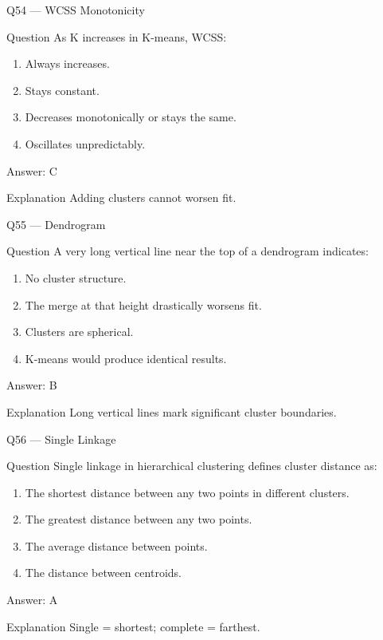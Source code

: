 \documentclass[aspectratio=169,8pt]{beamer}
\begin{document}
	\begin{frame}{Q54 --- WCSS Monotonicity}
		\begin{block}{Question}
			As K increases in K-means, WCSS:
		\end{block}
		\begin{enumerate}
			\item Always increases.
			\item Stays constant.
			\item Decreases monotonically or stays the same.
			\item Oscillates unpredictably.
		\end{enumerate}
		\begin{exampleblock}{Answer: C}\end{exampleblock}
		\begin{block}{Explanation}
			Adding clusters cannot worsen fit.
		\end{block}
	\end{frame}
	
	\begin{frame}{Q55 --- Dendrogram}
		\begin{block}{Question}
			A very long vertical line near the top of a dendrogram indicates:
		\end{block}
		\begin{enumerate}
			\item No cluster structure.
			\item The merge at that height drastically worsens fit.
			\item Clusters are spherical.
			\item K-means would produce identical results.
		\end{enumerate}
		\begin{exampleblock}{Answer: B}\end{exampleblock}
		\begin{block}{Explanation}
			Long vertical lines mark significant cluster boundaries.
		\end{block}
	\end{frame}
	
	\begin{frame}{Q56 --- Single Linkage}
		\begin{block}{Question}
			Single linkage in hierarchical clustering defines cluster distance as:
		\end{block}
		\begin{enumerate}
			\item The shortest distance between any two points in different clusters.
			\item The greatest distance between any two points.
			\item The average distance between points.
			\item The distance between centroids.
		\end{enumerate}
		\begin{exampleblock}{Answer: A}\end{exampleblock}
		\begin{block}{Explanation}
			Single = shortest; complete = farthest.
		\end{block}
	\end{frame}
	
\end{document}

